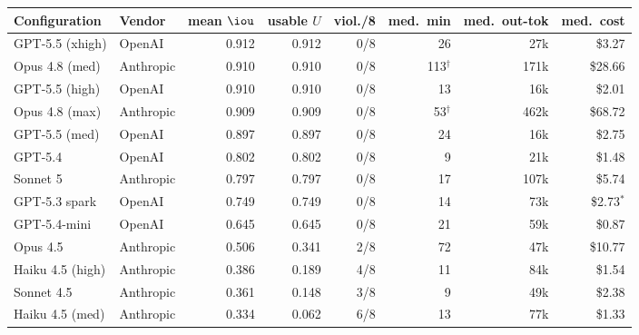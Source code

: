 \begin{tabular}{llrrrrrr}
\toprule
Configuration & Vendor & mean $\iou$ & usable $U$ & viol./8 & med.\ min & med.\ out-tok & med.\ cost \\
\midrule
GPT-5.5 (xhigh) & OpenAI & 0.912 & 0.912 & 0/8 & 26 & 27k & \$3.27 \\
Opus 4.8 (med) & Anthropic & 0.910 & 0.910 & 0/8 & 113$^\dagger$ & 171k & \$28.66 \\
GPT-5.5 (high) & OpenAI & 0.910 & 0.910 & 0/8 & 13 & 16k & \$2.01 \\
Opus 4.8 (max) & Anthropic & 0.909 & 0.909 & 0/8 & 53$^\dagger$ & 462k & \$68.72 \\
GPT-5.5 (med) & OpenAI & 0.897 & 0.897 & 0/8 & 24 & 16k & \$2.75 \\
GPT-5.4 & OpenAI & 0.802 & 0.802 & 0/8 & 9 & 21k & \$1.48 \\
Sonnet 5 & Anthropic & 0.797 & 0.797 & 0/8 & 17 & 107k & \$5.74 \\
GPT-5.3 spark & OpenAI & 0.749 & 0.749 & 0/8 & 14 & 73k & \$2.73$^\ast$ \\
GPT-5.4-mini & OpenAI & 0.645 & 0.645 & 0/8 & 21 & 59k & \$0.87 \\
Opus 4.5 & Anthropic & 0.506 & 0.341 & 2/8 & 72 & 47k & \$10.77 \\
Haiku 4.5 (high) & Anthropic & 0.386 & 0.189 & 4/8 & 11 & 84k & \$1.54 \\
Sonnet 4.5 & Anthropic & 0.361 & 0.148 & 3/8 & 9 & 49k & \$2.38 \\
Haiku 4.5 (med) & Anthropic & 0.334 & 0.062 & 6/8 & 13 & 77k & \$1.33 \\
\bottomrule
\end{tabular}
